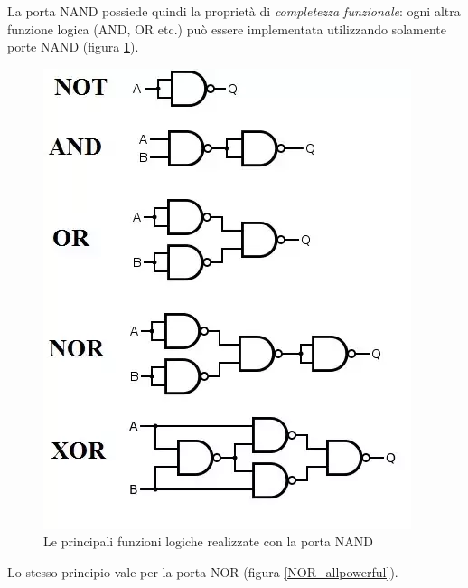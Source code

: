 \documentclass{article}
\begin{document}
\vspace{1mm}

La porta NAND possiede quindi la proprietà di \textit{completezza funzionale}: ogni altra funzione logica (AND, OR etc.) può essere implementata utilizzando solamente porte NAND (figura \ref{NAND_allpowerful}).

\begin{figure}[h]
  \centering
  \includegraphics[scale=0.7]{IM_NAND_allpowerful}
  \caption{Le principali funzioni logiche realizzate con la porta NAND}
  \label{NAND_allpowerful}
\end{figure}
\clearpage
Lo stesso principio vale per la porta NOR (figura \ref{NOR_allpowerful}).
\end{document}
